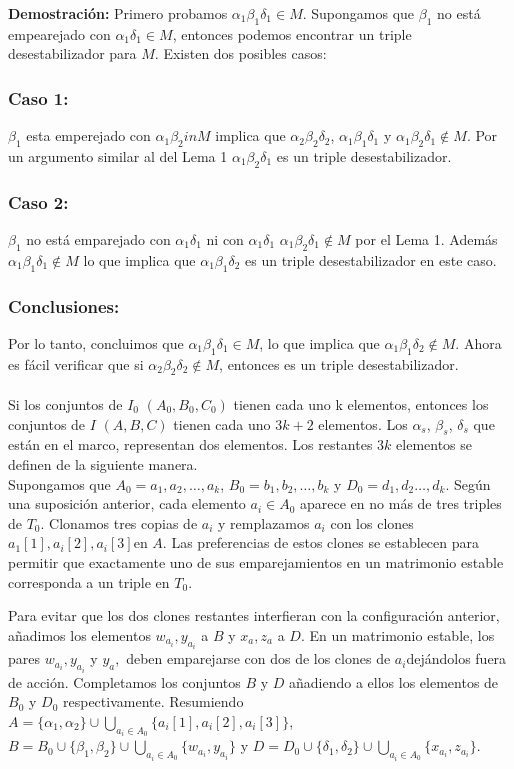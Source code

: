 \documentclass{article}
\begin{document}
\textbf{Demostración: }Primero probamos $\alpha_1 \beta_1 \delta_1 \in M$. Supongamos que $\beta_1$ no está empearejado con $\alpha_1 \delta_1 \in M$, entonces podemos encontrar un triple desestabilizador para $M$. Existen dos posibles casos:
\subsubsection{Caso 1:}
    $\beta_1$ esta emperejado con $\alpha_1 \beta_2 in M$ implica que $\alpha_2 \beta_2 \delta_2$, $\alpha_1 \beta_1 \delta_1$ y $\alpha_1 \beta_2 \delta_1 \notin M$. Por un argumento similar al del Lema 1 $\alpha_1 \beta_2 \delta_1$ es un triple desestabilizador.
\subsubsection{Caso 2:}
$\beta_1$ no está emparejado con $\alpha_1 \delta_1$ ni con $\alpha_1 \delta_1$ $\alpha_1 \beta_2 \delta_1 \notin M$ por el Lema 1. Además $\alpha_1 \beta_1 \delta_1 \notin M$ lo que implica que $\alpha_1 \beta_1 \delta_2$ es un triple desestabilizador en este caso.
\subsubsection{Conclusiones: }
Por lo tanto, concluimos que $\alpha_1 \beta_1 \delta_1 \in M$, lo que implica que $\alpha_1 \beta_1 \delta_2 \notin M$. Ahora es fácil verificar
que si $\alpha_2 \beta_2 \delta_2 \notin M$, entonces es un triple desestabilizador.
\\
\\
Si los conjuntos de $I_0$ $(A_0,B_0,C_0)$ tienen cada uno k elementos, entonces los conjuntos de $I$ $(A,B,C)$ tienen cada uno $3k+2$ elementos. Los $\alpha_s$, $\beta_s$, $\delta_s$ que están en el marco, representan dos elementos. Los restantes $3k$ elementos se definen de la siguiente manera. 
\\
Supongamos que $A_0={a_1,a_2,\dots,a_k}$, $B_0={b_1,b_2,\dots,b_k}$ y $D_0={d_1,d_2\dots,d_k}$.
Según una suposición anterior, cada elemento $a_i \in A_0$ aparece en no más de tres triples de $T_0$. Clonamos tres copias de $a_i$ y remplazamos $a_i$ con los clones $a_1[1],a_i[2],a_i[3] $en $A$.
Las preferencias de estos clones se establecen para permitir que exactamente uno de sus emparejamientos en un matrimonio estable corresponda a un triple en $T_0$.

Para evitar que los dos clones restantes interfieran con la configuración anterior, añadimos los elementos $w_{a_i},y_{a_i}$ a $B$ y $x_a,z_a$ a $D$. En un matrimonio estable, los pares
 $w_{a_i},y_{a_i}$ y $y_a,$ deben emparejarse con dos de los clones de $a_i$dejándolos fuera de acción. Completamos los conjuntos $B$ y $D$ añadiendo a ellos los elementos de $B_0$ y $D_0$ respectivamente.
 Resumiendo $A = \{\alpha_1, \alpha_2\} \cup \bigcup_{a_i \in A_0} \{a_i[1], a_i[2], a_i[3]\}$, 
 $B = B_0 \cup \{\beta_1, \beta_2\} \cup \bigcup_{a_i \in A_0} \{w_{a_i}, y_{a_i}\}$ y $D = D_0 \cup \{\delta_1, \delta_2\} \cup \bigcup_{a_i \in A_0} \{x_{a_i}, z_{a_i}\}$.\\ 
\end{document}
